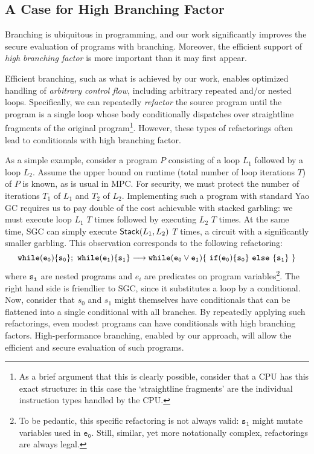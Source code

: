 \subsection{A Case for High Branching Factor}
\label{sec:motivationHighB}

Branching is ubiquitous in programming, and our work significantly
improves the secure evaluation of programs with branching.
Moreover, the efficient support of \emph{high branching factor}
is more important than it may first appear.

Efficient branching, such as what is
achieved by our work, enables optimized handling of \emph{arbitrary
control flow}, including arbitrary repeated and/or nested loops.
%
Specifically, we can repeatedly \emph{refactor} the source program
until the program is a single loop whose body conditionally dispatches
over straightline fragments of the original program\footnote{%
  As a brief argument that this is clearly possible, consider that a
  CPU has this exact structure: in this case the `straightline
  fragments' are the individual instruction types handled by the CPU.
}.
However, these types of refactorings often lead to conditionals with
high branching factor.

As a simple example,
consider a program $P$ consisting of a loop $L_1$ followed by a loop
$L_2$.  Assume the upper bound on runtime (total number of loop
iterations $T$) of $P$ is known, as is usual in MPC.
For security, we must protect the number of iterations $T_1$ of $L_1$
and $T_2$ of $L_2$.
Implementing such a program with standard Yao GC requires us to
pay double of the cost achievable with stacked garbling: we must
execute loop $L_1$ $T$ times followed by executing $L_2$ $T$ times.
At the same time, SGC can simply execute  $\textsf{Stack}(L_1, L_2)$ $T$
times, a circuit with a significantly smaller garbling. This observation corresponds to the
following refactoring:
\[{\tt while (e_0) \{ s_0 \} ; \ while (e_1) \{ s_1 \}}
\longrightarrow {\tt while (e_0 \lor e_1) \{\ if  (e_0) \{s_0\}\  else\  \{s_1\}\ \}} \]
where ${\tt s_i}$ are nested programs and $e_i$ are predicates on program
variables\footnote{%
  To be pedantic, this specific refactoring is not always
  valid: $\mathtt{s_1}$ might mutate variables used in
  $\mathtt{e_0}$. Still, similar, yet more notationally complex,
  refactorings are always legal.
}.
The right hand side is friendlier to SGC, since it
substitutes a loop by a conditional.
Now, consider that $s_0$ and $s_1$ might themselves have conditionals
that can be flattened into a single conditional with all branches.
By repeatedly applying such refactorings, even modest
programs can have conditionals with high branching factors.
High-performance branching, enabled by our approach, will allow the
efficient and secure evaluation of such programs.

